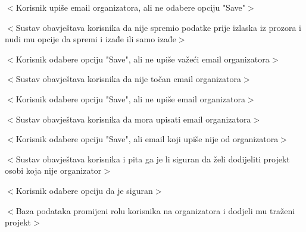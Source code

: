 \begin{packed_item}
\begin{packed_item}
\begin{packed_enum}
							\end{packed_enum}

							\item[9.a] $<$Korisnik upiše email organizatora, ali ne odabere opciju "Save"$>$
							\item[] \begin{packed_enum}

								\item $<$Sustav obavještava korisnika da nije spremio podatke prije izlaska
								iz prozora i nudi mu opcije da spremi i izađe ili samo izađe$>$

							\end{packed_enum}

							\item[9.b] $<$Korisnik odabere opciju "Save", ali ne upiše važeći email organizatora$>$
							\item[] \begin{packed_enum}

								\item $<$Sustav obavještava korisnika da nije točan email organizatora$>$

							\end{packed_enum}

							\item[9.c] $<$Korisnik odabere opciju "Save", ali ne upiše email organizatora$>$
							\item[] \begin{packed_enum}

								\item $<$Sustav obavještava korisnika da mora upisati email organizatora$>$

							\end{packed_enum}

							\item[9.d] $<$Korisnik odabere opciju "Save", ali email koji upiše nije od organizatora$>$
							\item[] \begin{packed_enum}

								\item $<$Sustav obavještava korisnika i pita ga je li siguran da želi dodijeliti projekt
								osobi koja nije organizator$>$
								\item $<$Korisnik odabere opciju da je siguran$>$
								\item $<$Baza podataka promijeni rolu korisnika na organizatora i dodjeli mu traženi projekt$>$

							\end{packed_enum}
					
						\end{packed_item}
					\end{packed_item}


